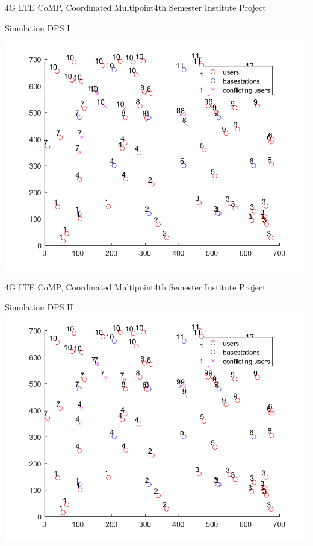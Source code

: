 \documentclass[xcolor={cmyk}]{beamer}
\begin{document}
 \begin{frame}{4G LTE CoMP, Coordinated Multipoint}{4th Semester Institute Project}
 \begin{block}{Simulation DPS I}
 
 \includegraphics[width=\linewidth,height=\textheight,keepaspectratio]{MapPlotDPS1.png}
 \end{block}
 \end{frame}
 
 \begin{frame}{4G LTE CoMP, Coordinated Multipoint}{4th Semester Institute Project}
 \begin{block}{Simulation DPS II}
 \includegraphics[width=\linewidth,height=\textheight,keepaspectratio]{MapPlotDPS2.png}
 \end{block}
 \end{frame}
 
\end{document}
